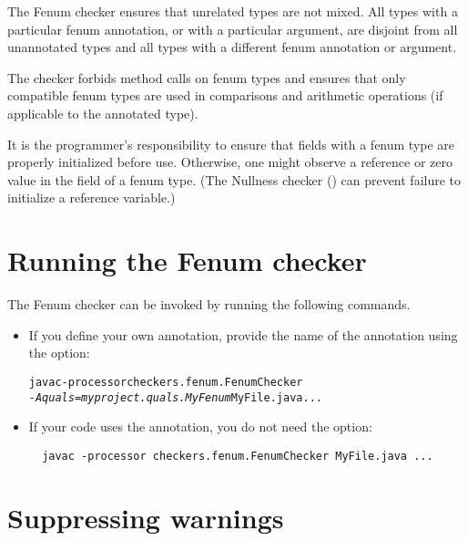 The Fenum checker ensures that unrelated types are not mixed. 
All types with a particular fenum annotation, or  with a particular  argument, are
disjoint from all unannotated types and all types with a different fenum
annotation or  argument.

The checker forbids method calls on fenum types and ensures that
only compatible fenum types are used in comparisons and arithmetic operations
(if applicable to the annotated type).

It is the programmer's responsibility to ensure that fields with a fenum type
are properly initialized before use.  Otherwise, one might observe a 
reference or zero value in the field of a fenum type.  (The Nullness checker
() can prevent failure to initialize a
reference variable.)


\section{Running the Fenum checker\label{fenum-running}}

The Fenum checker can be invoked by running the following commands.

\begin{itemize}
  \item 
If you define your own annotation, provide the name of the annotation using the
 option:

\begin{alltt}
  javac -processor checkers.fenum.FenumChecker
        \textit{-Aquals=myproject.quals.MyFenum} MyFile.java ...
\end{alltt}


\item
If your code uses the  annotation, you do
not need the  option:

\begin{Verbatim}
  javac -processor checkers.fenum.FenumChecker MyFile.java ...
\end{Verbatim}

\end{itemize}



\section{Suppressing warnings\label{fenum-suppressing}}

